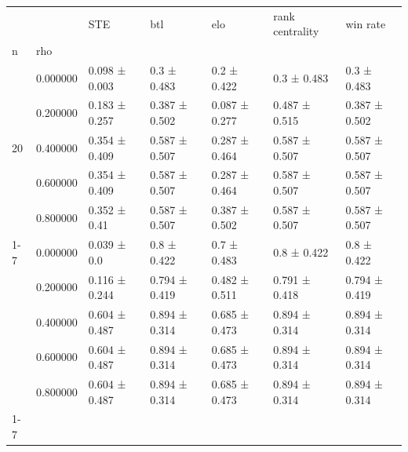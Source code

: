 \begin{tabular}{lllllll}
\toprule
 &  & STE & btl & elo & rank centrality & win rate \\
n & rho &  &  &  &  &  \\
\midrule
\multirow[t]{5}{*}{20} & 0.000000 & 0.098 ± 0.003 & 0.3 ± 0.483 & 0.2 ± 0.422 & 0.3 ± 0.483 & 0.3 ± 0.483 \\
 & 0.200000 & 0.183 ± 0.257 & 0.387 ± 0.502 & 0.087 ± 0.277 & 0.487 ± 0.515 & 0.387 ± 0.502 \\
 & 0.400000 & 0.354 ± 0.409 & 0.587 ± 0.507 & 0.287 ± 0.464 & 0.587 ± 0.507 & 0.587 ± 0.507 \\
 & 0.600000 & 0.354 ± 0.409 & 0.587 ± 0.507 & 0.287 ± 0.464 & 0.587 ± 0.507 & 0.587 ± 0.507 \\
 & 0.800000 & 0.352 ± 0.41 & 0.587 ± 0.507 & 0.387 ± 0.502 & 0.587 ± 0.507 & 0.587 ± 0.507 \\
\cline{1-7}
\multirow[t]{5}{*}{50} & 0.000000 & 0.039 ± 0.0 & 0.8 ± 0.422 & 0.7 ± 0.483 & 0.8 ± 0.422 & 0.8 ± 0.422 \\
 & 0.200000 & 0.116 ± 0.244 & 0.794 ± 0.419 & 0.482 ± 0.511 & 0.791 ± 0.418 & 0.794 ± 0.419 \\
 & 0.400000 & 0.604 ± 0.487 & 0.894 ± 0.314 & 0.685 ± 0.473 & 0.894 ± 0.314 & 0.894 ± 0.314 \\
 & 0.600000 & 0.604 ± 0.487 & 0.894 ± 0.314 & 0.685 ± 0.473 & 0.894 ± 0.314 & 0.894 ± 0.314 \\
 & 0.800000 & 0.604 ± 0.487 & 0.894 ± 0.314 & 0.685 ± 0.473 & 0.894 ± 0.314 & 0.894 ± 0.314 \\
\cline{1-7}
\bottomrule
\end{tabular}
